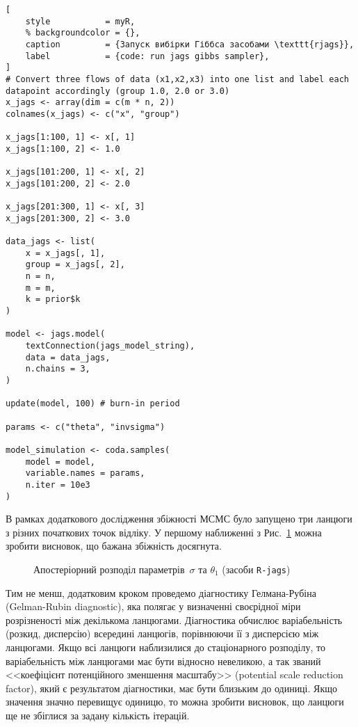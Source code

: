 \vspace{0.4cm}
\begin{lstlisting}[
    style           = myR, 
    % backgroundcolor = {},
    caption         = {Запуск вибірки Гіббса засобами \texttt{rjags}},
    label           = {code: run jags gibbs sampler},
]
# Convert three flows of data (x1,x2,x3) into one list and label each datapoint accordingly (group 1.0, 2.0 or 3.0)
x_jags <- array(dim = c(m * n, 2))
colnames(x_jags) <- c("x", "group")

x_jags[1:100, 1] <- x[, 1]
x_jags[1:100, 2] <- 1.0

x_jags[101:200, 1] <- x[, 2]
x_jags[101:200, 2] <- 2.0

x_jags[201:300, 1] <- x[, 3]
x_jags[201:300, 2] <- 3.0

data_jags <- list(
    x = x_jags[, 1],
    group = x_jags[, 2],
    n = n,
    m = m,
    k = prior$k
)

model <- jags.model(
    textConnection(jags_model_string),
    data = data_jags,
    n.chains = 3,
)

update(model, 100) # burn-in period

params <- c("theta", "invsigma")

model_simulation <- coda.samples(
    model = model,
    variable.names = params,
    n.iter = 10e3
)
\end{lstlisting}

\vspace{0.4cm}
В рамках додаткового дослідження збіжності МСМС було запущено три ланцюги з різних початкових точок відліку. У першому наближенні з Рис.~\ref{pic: jags Gibbs Sampler traceplot} можна зробити висновок, що бажана збіжність досягнута. 

\vspace{0.4cm}
\begin{figure}[H]\centering
    \caption{Апостеріорний розподіл параметрів~$\sigma$ та $\theta_1$ (засоби \texttt{R-jags})}
    \label{pic: jags Gibbs Sampler traceplot}
\end{figure}

Тим не менш, додатковим кроком проведемо діагностику Гелмана-Рубіна (Gelman-Rubin diagnostic), яка полягає у визначенні своєрідної міри розрізненості між декількома ланцюгами. Діагностика обчислює варіабельність (розкид, дисперсію) всередині ланцюгів, порівнюючи її з дисперсією між ланцюгами. Якщо всі ланцюги наблизилися до стаціонарного розподілу, то варіабельність між ланцюгами має бути відносно невеликою, а так званий <<коефіцієнт потенційного зменшення масштабу>> (potential scale reduction factor), який є результатом діагностики, має бути близьким до одиниці. Якщо значення значно перевищує одиницю, то можна зробити висновок, що ланцюги ще не збіглися за задану кількість ітерацій.

